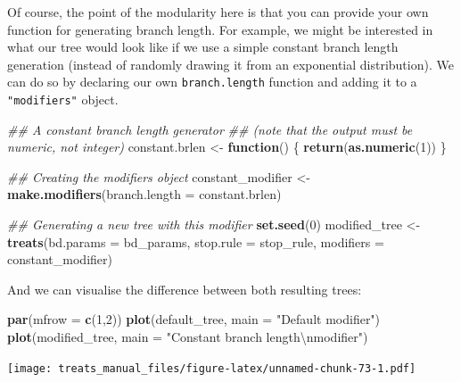 \documentclass[
]{book}
\newenvironment{Shaded}{\begin{snugshade}}{\end{snugshade}}
\newcommand{\CharTok}[1]{\textcolor[rgb]{0.31,0.60,0.02}{#1}}
\newcommand{\CommentTok}[1]{\textcolor[rgb]{0.56,0.35,0.01}{\textit{#1}}}
\newcommand{\ControlFlowTok}[1]{\textcolor[rgb]{0.13,0.29,0.53}{\textbf{#1}}}
\newcommand{\DataTypeTok}[1]{\textcolor[rgb]{0.13,0.29,0.53}{#1}}
\newcommand{\DecValTok}[1]{\textcolor[rgb]{0.00,0.00,0.81}{#1}}
\newcommand{\KeywordTok}[1]{\textcolor[rgb]{0.13,0.29,0.53}{\textbf{#1}}}
\newcommand{\NormalTok}[1]{#1}
\newcommand{\StringTok}[1]{\textcolor[rgb]{0.31,0.60,0.02}{#1}}
\begin{document}
Of course, the point of the modularity here is that you can provide your own function for generating branch length.
For example, we might be interested in what our tree would look like if we use a simple constant branch length generation (instead of randomly drawing it from an exponential distribution).
We can do so by declaring our own \texttt{branch.length} function and adding it to a \texttt{"modifiers"} object.

\begin{Shaded}
\begin{Highlighting}[]
\CommentTok{\#\# A constant branch length generator}
\CommentTok{\#\# (note that the output must be numeric, not integer)}
\NormalTok{constant.brlen \textless{}{-}}\StringTok{ }\ControlFlowTok{function}\NormalTok{() \{}
    \KeywordTok{return}\NormalTok{(}\KeywordTok{as.numeric}\NormalTok{(}\DecValTok{1}\NormalTok{))}
\NormalTok{\}}

\CommentTok{\#\# Creating the modifiers object}
\NormalTok{constant\_modifier \textless{}{-}}\StringTok{ }\KeywordTok{make.modifiers}\NormalTok{(}\DataTypeTok{branch.length =}\NormalTok{ constant.brlen)}

\CommentTok{\#\# Generating a new tree with this modifier}
\KeywordTok{set.seed}\NormalTok{(}\DecValTok{0}\NormalTok{)}
\NormalTok{modified\_tree \textless{}{-}}\StringTok{ }\KeywordTok{treats}\NormalTok{(}\DataTypeTok{bd.params =}\NormalTok{ bd\_params,}
                      \DataTypeTok{stop.rule =}\NormalTok{ stop\_rule,}
                      \DataTypeTok{modifiers =}\NormalTok{ constant\_modifier)}
\end{Highlighting}
\end{Shaded}

And we can visualise the difference between both resulting trees:

\begin{Shaded}
\begin{Highlighting}[]
\KeywordTok{par}\NormalTok{(}\DataTypeTok{mfrow =} \KeywordTok{c}\NormalTok{(}\DecValTok{1}\NormalTok{,}\DecValTok{2}\NormalTok{))}
\KeywordTok{plot}\NormalTok{(default\_tree,  }\DataTypeTok{main =} \StringTok{"Default modifier"}\NormalTok{)}
\KeywordTok{plot}\NormalTok{(modified\_tree, }\DataTypeTok{main =} \StringTok{"Constant branch length}\CharTok{\textbackslash{}n}\StringTok{modifier"}\NormalTok{)}
\end{Highlighting}
\end{Shaded}

\texttt{[image: treats\_manual\_files/figure-latex/unnamed-chunk-73-1.pdf]}
\end{document}

